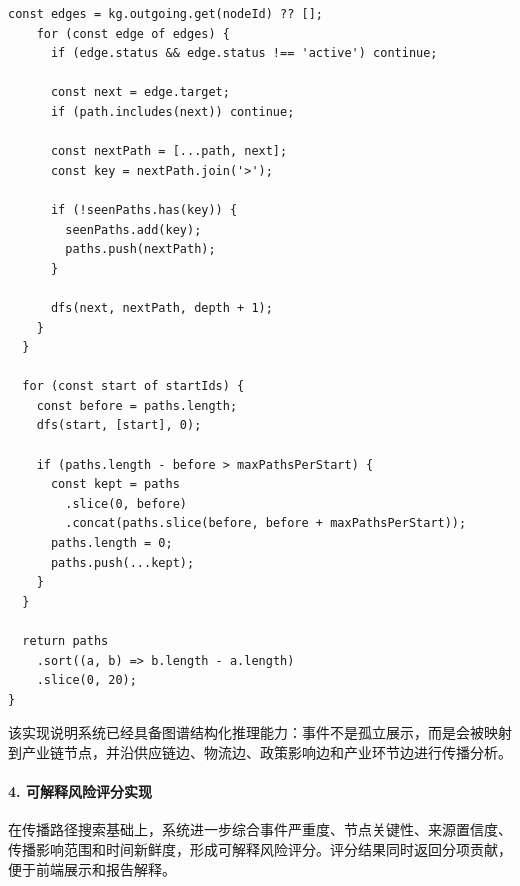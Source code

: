 \documentclass[12pt,a4paper]{article}
\begin{document}
\begin{lstlisting}[style=projectcode,caption={事件到产业链图谱的匹配与传播路径搜索}]
    const edges = kg.outgoing.get(nodeId) ?? [];
    for (const edge of edges) {
      if (edge.status && edge.status !== 'active') continue;

      const next = edge.target;
      if (path.includes(next)) continue;

      const nextPath = [...path, next];
      const key = nextPath.join('>');

      if (!seenPaths.has(key)) {
        seenPaths.add(key);
        paths.push(nextPath);
      }

      dfs(next, nextPath, depth + 1);
    }
  }

  for (const start of startIds) {
    const before = paths.length;
    dfs(start, [start], 0);

    if (paths.length - before > maxPathsPerStart) {
      const kept = paths
        .slice(0, before)
        .concat(paths.slice(before, before + maxPathsPerStart));
      paths.length = 0;
      paths.push(...kept);
    }
  }

  return paths
    .sort((a, b) => b.length - a.length)
    .slice(0, 20);
}
\end{lstlisting}

该实现说明系统已经具备图谱结构化推理能力：事件不是孤立展示，而是会被映射到产业链节点，并沿供应链边、物流边、政策影响边和产业环节边进行传播分析。

\paragraph{4. 可解释风险评分实现}

在传播路径搜索基础上，系统进一步综合事件严重度、节点关键性、来源置信度、传播影响范围和时间新鲜度，形成可解释风险评分。评分结果同时返回分项贡献，便于前端展示和报告解释。
\end{document}
